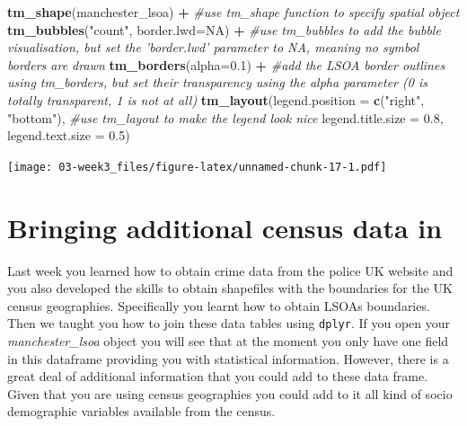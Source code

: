 \documentclass[]{book}
\newenvironment{Shaded}{\begin{snugshade}}{\end{snugshade}}
\newcommand{\CommentTok}[1]{\textcolor[rgb]{0.56,0.35,0.01}{\textit{#1}}}
\newcommand{\DataTypeTok}[1]{\textcolor[rgb]{0.13,0.29,0.53}{#1}}
\newcommand{\FloatTok}[1]{\textcolor[rgb]{0.00,0.00,0.81}{#1}}
\newcommand{\KeywordTok}[1]{\textcolor[rgb]{0.13,0.29,0.53}{\textbf{#1}}}
\newcommand{\NormalTok}[1]{#1}
\newcommand{\OperatorTok}[1]{\textcolor[rgb]{0.81,0.36,0.00}{\textbf{#1}}}
\newcommand{\OtherTok}[1]{\textcolor[rgb]{0.56,0.35,0.01}{#1}}
\newcommand{\StringTok}[1]{\textcolor[rgb]{0.31,0.60,0.02}{#1}}
\begin{document}
\begin{Shaded}
\begin{Highlighting}[]
\KeywordTok{tm_shape}\NormalTok{(manchester_lsoa) }\OperatorTok{+}\StringTok{                         }\CommentTok{#use tm_shape function to specify spatial object}
\StringTok{  }\KeywordTok{tm_bubbles}\NormalTok{(}\StringTok{"count"}\NormalTok{, }\DataTypeTok{border.lwd=}\OtherTok{NA}\NormalTok{) }\OperatorTok{+}\StringTok{              }\CommentTok{#use tm_bubbles to add the bubble visualisation, but set the 'border.lwd' parameter to NA, meaning no symbol borders are drawn}
\StringTok{  }\KeywordTok{tm_borders}\NormalTok{(}\DataTypeTok{alpha=}\FloatTok{0.1}\NormalTok{) }\OperatorTok{+}\StringTok{                           }\CommentTok{#add the LSOA border outlines using tm_borders, but set their transparency using the alpha parameter (0 is totally transparent, 1 is not at all)}
\StringTok{  }\KeywordTok{tm_layout}\NormalTok{(}\DataTypeTok{legend.position =} \KeywordTok{c}\NormalTok{(}\StringTok{"right"}\NormalTok{, }\StringTok{"bottom"}\NormalTok{), }\CommentTok{#use tm_layout to make the legend look nice}
            \DataTypeTok{legend.title.size =} \FloatTok{0.8}\NormalTok{,}
            \DataTypeTok{legend.text.size =} \FloatTok{0.5}\NormalTok{)}
\end{Highlighting}
\end{Shaded}

\texttt{[image: 03-week3\_files/figure-latex/unnamed-chunk-17-1.pdf]}

\hypertarget{bringing-additional-census-data-in}{%
\section{Bringing additional census data in}\label{bringing-additional-census-data-in}}

Last week you learned how to obtain crime data from the police UK website and you also developed the skills to obtain shapefiles with the boundaries for the UK census geographies. Specifically you learnt how to obtain LSOAs boundaries. Then we taught you how to join these data tables using \texttt{dplyr}. If you open your \emph{manchester\_lsoa} object you will see that at the moment you only have one field in this dataframe providing you with statistical information. However, there is a great deal of additional information that you could add to these data frame. Given that you are using census geographies you could add to it all kind of socio demographic variables available from the census.
\end{document}
